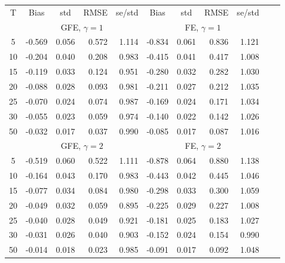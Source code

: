 \documentclass[preview]{standalone}
\begin{document}
 
\begin{tabular}{c r r r r r r r r r r} 
\toprule 
T & \multicolumn{1}{c}{ Bias } & \multicolumn{1}{c}{ std } & \multicolumn{1}{c}{ RMSE } & \multicolumn{1}{c}{ se/std } & \multicolumn{1}{c}{ Bias } & \multicolumn{1}{c}{ std } & \multicolumn{1}{c}{ RMSE } & \multicolumn{1}{c}{ se/std }\\[2pt]
 & \multicolumn{ 4 }{c}{ GFE, $\gamma=1$} & \multicolumn{ 4 }{c}{ FE, $\gamma=1$}\\[-3pt]
 \cmidrule(lr){2-5}  \cmidrule(lr){6-9}
5 &     -0.569 &      0.056 &      0.572 &      1.114 &     -0.834 &      0.061 &      0.836 &      1.121\\
10 &     -0.204 &      0.040 &      0.208 &      0.983 &     -0.415 &      0.041 &      0.417 &      1.008\\
15 &     -0.119 &      0.033 &      0.124 &      0.951 &     -0.280 &      0.032 &      0.282 &      1.030\\
20 &     -0.088 &      0.028 &      0.093 &      0.981 &     -0.211 &      0.027 &      0.212 &      1.035\\
25 &     -0.070 &      0.024 &      0.074 &      0.987 &     -0.169 &      0.024 &      0.171 &      1.034\\
30 &     -0.055 &      0.023 &      0.059 &      0.974 &     -0.140 &      0.022 &      0.142 &      1.026\\
50 &     -0.032 &      0.017 &      0.037 &      0.990 &     -0.085 &      0.017 &      0.087 &      1.016\\[0pt]
 & \multicolumn{ 4 }{c}{ GFE, $\gamma=2$} & \multicolumn{ 4 }{c}{ FE, $\gamma=2$}\\[-3pt]
 \cmidrule(lr){2-5}  \cmidrule(lr){6-9}
5 &     -0.519 &      0.060 &      0.522 &      1.111 &     -0.878 &      0.064 &      0.880 &      1.138\\
10 &     -0.164 &      0.043 &      0.170 &      0.983 &     -0.443 &      0.042 &      0.445 &      1.046\\
15 &     -0.077 &      0.034 &      0.084 &      0.980 &     -0.298 &      0.033 &      0.300 &      1.059\\
20 &     -0.049 &      0.032 &      0.059 &      0.895 &     -0.225 &      0.029 &      0.227 &      1.008\\
25 &     -0.040 &      0.028 &      0.049 &      0.921 &     -0.181 &      0.025 &      0.183 &      1.027\\
30 &     -0.031 &      0.026 &      0.040 &      0.903 &     -0.152 &      0.024 &      0.154 &      0.990\\
50 &     -0.014 &      0.018 &      0.023 &      0.985 &     -0.091 &      0.017 &      0.092 &      1.048\\[0pt]
\bottomrule 
\end{tabular}
\end{document}
